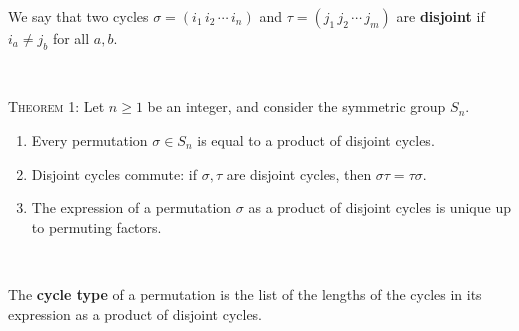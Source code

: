 \documentclass[12pt]{amsart}
\begin{document}
\begin{framed}
We say that two cycles $\sigma = (i_1 \, i_2 \, \cdots \, i_n)$ and $\tau = (j_1 \, j_2 \, \cdots \, j_m)$ are \textbf{disjoint} if $i_a \neq j_b$ for all $a,b$.

\


\textsc{Theorem 1:} Let $n\geq 1$ be an integer, and consider the symmetric group $S_n$.
\begin{enumerate}
\item Every permutation $\sigma \in S_n$ is equal to a product of disjoint cycles. 
\item Disjoint cycles commute: if $\sigma, \tau$ are disjoint cycles, then $\sigma\tau=\tau\sigma$.
\item The expression of a permutation $\sigma$ as a product of disjoint cycles is unique up to permuting factors.
\end{enumerate}


\

The \textbf{cycle type} of a permutation is the list of the lengths of the cycles in its expression as a product of disjoint cycles. 
\end{framed}
\end{document}
